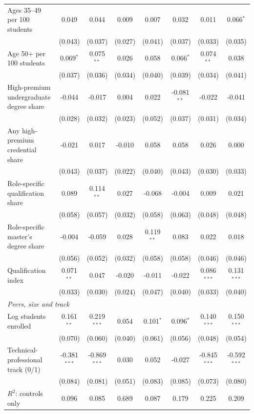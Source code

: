 \begin{table}[!htbp]
{\begin{tabular}{lccccccc}
\quad Ages 35--49 per 100 students & 0.049 & 0.044 & 0.009 & 0.007 & 0.032 & 0.011 & 0.066$^{*}$ \\
 & (0.043) & (0.037) & (0.027) & (0.041) & (0.037) & (0.033) & (0.035) \\
\quad Age 50+ per 100 students & 0.069$^{*}$ & 0.075$^{**}$ & 0.026 & 0.058 & 0.066$^{*}$ & 0.074$^{**}$ & 0.038 \\
 & (0.037) & (0.036) & (0.034) & (0.040) & (0.039) & (0.034) & (0.041) \\
\quad High-premium undergraduate degree share & -0.044 & -0.017 & 0.004 & 0.022 & -0.081$^{**}$ & -0.022 & -0.041 \\
 & (0.028) & (0.032) & (0.023) & (0.052) & (0.037) & (0.031) & (0.034) \\
\quad Any high-premium credential share & -0.021 & 0.017 & -0.010 & 0.058 & 0.058 & 0.026 & 0.000 \\
 & (0.043) & (0.037) & (0.022) & (0.040) & (0.043) & (0.030) & (0.033) \\
\quad Role-specific qualification share & 0.089 & 0.114$^{**}$ & 0.027 & -0.068 & -0.004 & 0.009 & 0.021 \\
 & (0.058) & (0.057) & (0.032) & (0.058) & (0.063) & (0.048) & (0.048) \\
\quad Role-specific master's degree share & -0.004 & -0.059 & 0.028 & 0.119$^{**}$ & 0.083 & 0.022 & 0.018 \\
 & (0.056) & (0.052) & (0.032) & (0.058) & (0.058) & (0.046) & (0.046) \\
\quad Qualification index & 0.071$^{**}$ & 0.047 & -0.020 & -0.011 & -0.022 & 0.086$^{***}$ & 0.131$^{***}$ \\
 & (0.033) & (0.030) & (0.024) & (0.047) & (0.040) & (0.033) & (0.040) \\
\multicolumn{8}{l}{\textit{Peers, size and track}} \\
\quad Log students enrolled & 0.161$^{**}$ & 0.219$^{***}$ & 0.054 & 0.101$^{*}$ & 0.096$^{*}$ & 0.140$^{***}$ & 0.150$^{***}$ \\
 & (0.070) & (0.060) & (0.040) & (0.061) & (0.056) & (0.048) & (0.054) \\
\quad Technical-professional track (0/1) & -0.381$^{***}$ & -0.869$^{***}$ & 0.030 & 0.052 & -0.027 & -0.845$^{***}$ & -0.592$^{***}$ \\
 & (0.084) & (0.081) & (0.051) & (0.083) & (0.085) & (0.073) & (0.080) \\
\midrule
$R^2$: controls only & 0.096 & 0.085 & 0.689 & 0.087 & 0.179 & 0.225 & 0.209 \\

\end{tabular}}
\end{table}

